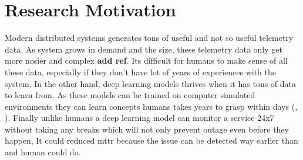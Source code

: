 \section{Research Motivation}

Modern distributed systems generates tons of useful and not so useful telemetry data. As system grows in demand and the size, these telemetry data only get more nosier and complex \textbf{add ref}. Its difficult for humans to make sense of all these data, especially if they don't have lot of years of experiences with the system. In the other hand, deep learning models thrives when it has tons of data to learn from. As these models can be trained on computer simulated environments they can learn concepts humans takes years to grasp within days (\cite{OpenAI_dota}, \cite{silver2017mastering}). Finally unlike humans a deep learning model can monitor a service 24x7 without taking any breaks which will not only prevent outage even before they happen, It could reduced \ac{mttr} because the issue can be detected way earlier than and human could do. 

